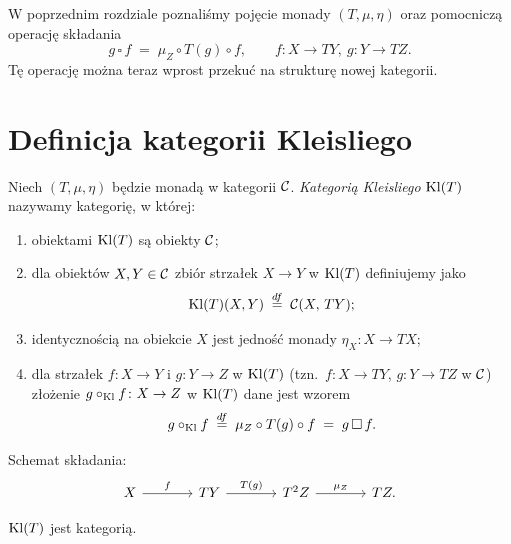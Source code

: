 W poprzednim rozdziale poznaliśmy pojęcie monady $(T,\mu,\eta)$ oraz pomocniczą operację składania
\[
g\,\square\,f \;=\; \mu_Z\circ T(g)\circ f, \qquad f\colon X\to TY,\ g\colon Y\to TZ.
\]
Tę operację można teraz wprost przekuć na strukturę nowej kategorii.

\section{Definicja kategorii Kleisliego}

\begin{definicja}
Niech $(T,\mu,\eta)$ będzie monadą w kategorii $\mathcal{C}$. \emph{Kategorią Kleisliego} $\mathrm{Kl}(T)$ nazywamy kategorię, w której:
\begin{enumerate}
\item obiektami $\mathrm{Kl}(T)$ są obiekty $\mathcal{C}$;
\item dla obiektów $X,Y\in\mathcal{C}$ zbiór strzałek $X\to Y$ w $\mathrm{Kl}(T)$ definiujemy jako
\[
\mathrm{Kl}(T)(X,Y) \;\stackrel{df}{=}\; \mathcal{C}(X,\,T Y);
\]
\item identycznością na obiekcie $X$ jest jedność monady $\eta_X\colon X\to TX$;
\item dla strzałek $f\colon X\to Y$ i $g\colon Y\to Z$ w $\mathrm{Kl}(T)$ (tzn.\ $f\colon X\to TY$, $g\colon Y\to TZ$ w $\mathcal{C}$) złożenie $g\circ_{\mathrm{Kl}} f\colon X\to Z$ w $\mathrm{Kl}(T)$ dane jest wzorem
\[
g\circ_{\mathrm{Kl}} f \;\stackrel{df}{=}\; \mu_Z \circ T(g) \circ f \;=\; g\,\square\,f.
\]
\end{enumerate}
\end{definicja}

Schemat składania:
\[
\begin{tikzcd}[column sep=large]
X \arrow[r,"f"] & TY \arrow[r,"T(g)"] & T^2 Z \arrow[r,"\mu_Z"] & TZ.
\end{tikzcd}
\]

\begin{stwierdzenie}
$\mathrm{Kl}(T)$ jest kategorią.
\end{stwierdzenie}

